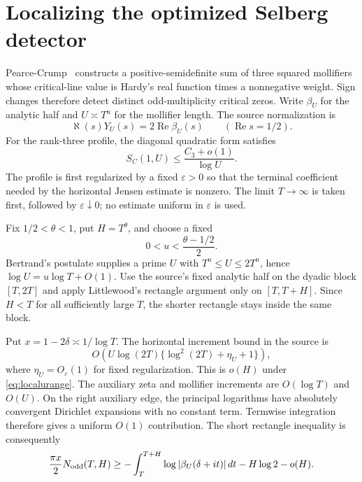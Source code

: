 \documentclass[11pt]{article}
\theoremstyle{remark}
\begin{document}
\section{Localizing the optimized Selberg detector}
\label{sec:localselberg}

Pearce-Crump~\cite{PearceCrump} constructs a positive-semidefinite sum of
three squared mollifiers whose critical-line value is Hardy's real function
times a nonnegative weight. Sign changes therefore detect distinct
odd-multiplicity critical zeros. Write $\beta_U$ for the analytic half and
$U\asymp T^u$ for the mollifier length. The source normalization is
\begin{equation}\label{eq:selbergnormalization}
 \aleph(s)Y_U(s)=2\operatorname{Re}\beta_U(s)
 \qquad (\operatorname{Re}s=1/2).
\end{equation}
For the rank-three profile, the diagonal quadratic form satisfies
\begin{equation}\label{eq:c3diagonal}
 S_C(1,U)\le\frac{C_3+o(1)}{\log U}.
\end{equation}
The profile is first regularized by a fixed $\varepsilon>0$ so that the
terminal coefficient needed by the horizontal Jensen estimate is nonzero.
The limit $T\to\infty$ is taken first, followed by
$\varepsilon\downarrow0$; no estimate uniform in $\varepsilon$ is used.

Fix $1/2<\theta<1$, put $H=T^\theta$, and choose a fixed
\begin{equation}\label{eq:localurange}
 0<u<\frac{\theta-1/2}{2}.
\end{equation}
Bertrand's postulate supplies a prime $U$ with
$T^u\le U\le2T^u$, hence $\log U=u\log T+O(1)$. Use the source's fixed
analytic half on the dyadic block $[T,2T]$ and apply Littlewood's rectangle
argument only on $[T,T+H]$. Since $H<T$ for all sufficiently large $T$,
the shorter rectangle stays inside the same block.

Put $x=1-2\delta\asymp1/\log T$. The horizontal increment bound in the
source is
\[
 O\!\left(U\log(2T)\{\log^2(2T)+\eta_U+1\}\right),
\]
where $\eta_U=O_\varepsilon(1)$ for fixed regularization. This is $o(H)$
under \eqref{eq:localurange}. The auxiliary zeta and mollifier increments
are $O(\log T)$ and $O(U)$. On the right auxiliary edge, the principal
logarithms have absolutely convergent Dirichlet expansions with no constant
term. Termwise integration therefore gives a uniform $O(1)$ contribution.
The short rectangle inequality is consequently
\begin{equation}\label{eq:shortrectangle}
 \frac{\pi x}{2}N_{\rm odd}(T,H)
 \ge-\int_T^{T+H}\log|\beta_U(\delta+it)|\,dt
       -H\log2-o(H).
\end{equation}
\end{document}
